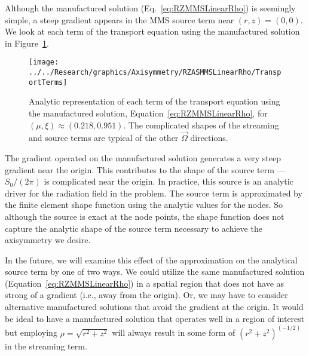 \documentclass[12pt,letterpaper]{article}
\begin{document}
Although the manufactured solution (Eq.~\ref{eq:RZMMSLinearRho}) is seemingly simple, a steep gradient appears in the MMS source term near $(r,z)=(0,0)$. We look at each term of the transport equation using the manufactured solution in Figure~\ref{fig:RZMMSLinearRhoAnalytic}.
%
\begin{figure}[tb]
\texttt{[image: ../../Research/graphics/Axisymmetry/RZASMMSLinearRho/TransportTerms]}
\caption{Analytic representation of each term of the transport equation using the manufactured solution, Equation~\ref{eq:RZMMSLinearRho}, for $(\mu,\xi) \approx (0.218,0.951)$. The complicated shapes of the streaming and source terms are typical of the other $\vec{\Omega}$ directions.}
\label{fig:RZMMSLinearRhoAnalytic}
\end{figure}
%
The gradient operated on the manufactured solution generates a very steep gradient near the origin. This contributes to the shape of the source term --- $S_0/(2 \pi)$ is complicated near the origin. In practice, this source is an analytic driver for the radiation field in the problem. The source term is approximated by the finite element shape function using the analytic values for the nodes. So although the source is exact at the node points, the shape function does not capture the analytic shape of the source term necessary to achieve the axisymmetry we desire.


In the future, we will examine this effect of the approximation on the analytical source term by one of two ways. We could utilize the same manufactured solution (Equation~\ref{eq:RZMMSLinearRho}) in a spatial region that does not have as strong of a gradient (i.e., away from the origin). Or, we may have to consider alternative manufactured solutions that avoid the gradient at the origin. It would be ideal to have a manufactured solution that operates well in a region of interest but employing $\rho=\sqrt{r^2+z^2}$ will always result in some form of $\left(r^2+z^2 \right)^{(-1/2)}$ in the streaming term.

\FloatBarrier

\end{document}
